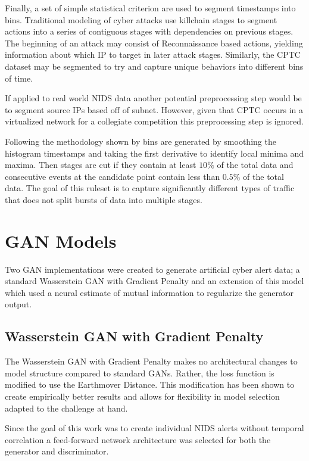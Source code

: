 

Finally, a set of simple statistical criterion are used to segment timestamps into bins. Traditional modeling of cyber attacks use killchain stages to segment actions into a series of contiguous stages with dependencies on previous stages. The beginning of an attack may consist of Reconnaissance based actions, yielding information about which IP to target in later attack stages. Similarly, the CPTC dataset may be segmented to try and capture unique behaviors into different bins of time. 

If applied to real world NIDS data another potential preprocessing step would be to segment source IPs based off of subnet. However, given that CPTC occurs in a virtualized network for a collegiate competition this preprocessing step is ignored. 

Following the methodology shown by \cite{us} bins are generated by smoothing the histogram timestamps and taking the first derivative to identify local minima and maxima. Then stages are cut if they contain at least $10\%$ of the total data and consecutive events at the candidate point contain less than $0.5\%$ of the total data. The goal of this ruleset is to capture significantly different types of traffic that does not split bursts of data into multiple stages.

\section{GAN Models}
\label{sec:model_arch}
Two GAN implementations were created to generate artificial cyber alert data; a standard Wasserstein GAN with Gradient Penalty and an extension of this model which used a neural estimate of mutual information to regularize the generator output.  

\subsection{Wasserstein GAN with Gradient Penalty}
\label{sec:gan}
The Wasserstein GAN with Gradient Penalty makes no architectural changes to model structure compared to standard GANs. Rather, the loss function is modified to use the Earthmover Distance. This modification has been shown to create empirically better results and allows for flexibility in model selection adapted to the challenge at hand.

Since the goal of this work was to create individual NIDS alerts without temporal correlation a feed-forward network architecture was selected for both the generator and discriminator. 

